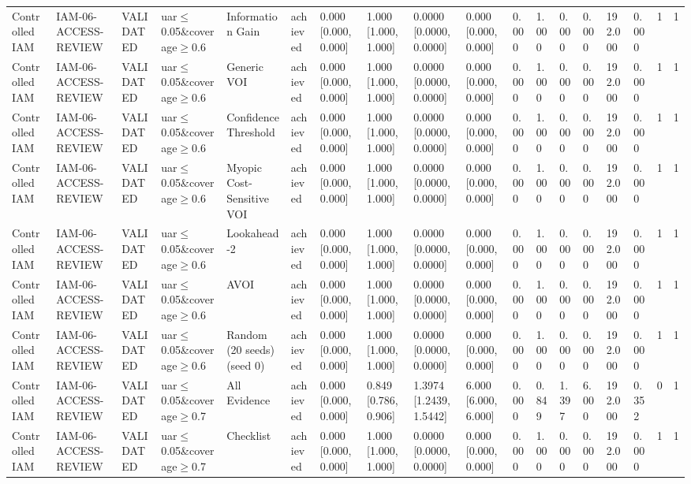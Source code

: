 \begin{table}[!ht]
{\begin{tabular}{llllllllllllllllll}
Controlled IAM & IAM-06-ACCESS-REVIEW & VALIDATED & uar$\le$0.05\&coverage$\ge$0.6 & Information Gain & achieved & 0.000 [0.000, 0.000] & 1.000 [1.000, 1.000] & 0.0000 [0.0000, 0.0000] & 0.000 [0.000, 0.000] & 0.000 & 1.000 & 0.000 & 0.000 & 192.000 & 0.000 & 1 & 1 \\
Controlled IAM & IAM-06-ACCESS-REVIEW & VALIDATED & uar$\le$0.05\&coverage$\ge$0.6 & Generic VOI & achieved & 0.000 [0.000, 0.000] & 1.000 [1.000, 1.000] & 0.0000 [0.0000, 0.0000] & 0.000 [0.000, 0.000] & 0.000 & 1.000 & 0.000 & 0.000 & 192.000 & 0.000 & 1 & 1 \\
Controlled IAM & IAM-06-ACCESS-REVIEW & VALIDATED & uar$\le$0.05\&coverage$\ge$0.6 & Confidence Threshold & achieved & 0.000 [0.000, 0.000] & 1.000 [1.000, 1.000] & 0.0000 [0.0000, 0.0000] & 0.000 [0.000, 0.000] & 0.000 & 1.000 & 0.000 & 0.000 & 192.000 & 0.000 & 1 & 1 \\
Controlled IAM & IAM-06-ACCESS-REVIEW & VALIDATED & uar$\le$0.05\&coverage$\ge$0.6 & Myopic Cost-Sensitive VOI & achieved & 0.000 [0.000, 0.000] & 1.000 [1.000, 1.000] & 0.0000 [0.0000, 0.0000] & 0.000 [0.000, 0.000] & 0.000 & 1.000 & 0.000 & 0.000 & 192.000 & 0.000 & 1 & 1 \\
Controlled IAM & IAM-06-ACCESS-REVIEW & VALIDATED & uar$\le$0.05\&coverage$\ge$0.6 & Lookahead-2 & achieved & 0.000 [0.000, 0.000] & 1.000 [1.000, 1.000] & 0.0000 [0.0000, 0.0000] & 0.000 [0.000, 0.000] & 0.000 & 1.000 & 0.000 & 0.000 & 192.000 & 0.000 & 1 & 1 \\
Controlled IAM & IAM-06-ACCESS-REVIEW & VALIDATED & uar$\le$0.05\&coverage$\ge$0.6 & AVOI & achieved & 0.000 [0.000, 0.000] & 1.000 [1.000, 1.000] & 0.0000 [0.0000, 0.0000] & 0.000 [0.000, 0.000] & 0.000 & 1.000 & 0.000 & 0.000 & 192.000 & 0.000 & 1 & 1 \\
Controlled IAM & IAM-06-ACCESS-REVIEW & VALIDATED & uar$\le$0.05\&coverage$\ge$0.6 & Random (20 seeds) (seed 0) & achieved & 0.000 [0.000, 0.000] & 1.000 [1.000, 1.000] & 0.0000 [0.0000, 0.0000] & 0.000 [0.000, 0.000] & 0.000 & 1.000 & 0.000 & 0.000 & 192.000 & 0.000 & 1 & 1 \\
Controlled IAM & IAM-06-ACCESS-REVIEW & VALIDATED & uar$\le$0.05\&coverage$\ge$0.7 & All Evidence & achieved & 0.000 [0.000, 0.000] & 0.849 [0.786, 0.906] & 1.3974 [1.2439, 1.5442] & 6.000 [6.000, 6.000] & 0.000 & 0.849 & 1.397 & 6.000 & 192.000 & 0.352 & 0 & 1 \\
Controlled IAM & IAM-06-ACCESS-REVIEW & VALIDATED & uar$\le$0.05\&coverage$\ge$0.7 & Checklist & achieved & 0.000 [0.000, 0.000] & 1.000 [1.000, 1.000] & 0.0000 [0.0000, 0.0000] & 0.000 [0.000, 0.000] & 0.000 & 1.000 & 0.000 & 0.000 & 192.000 & 0.000 & 1 & 1 \\

\end{tabular}}
\end{table}
